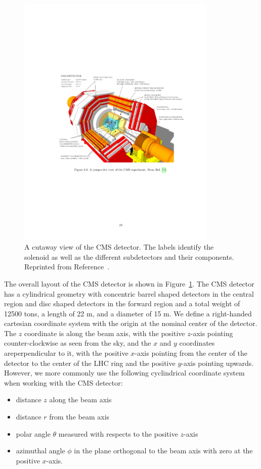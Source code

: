 \begin{figure}[htbp]
  \centering
  \includegraphics[width=0.85\textwidth]{Detector/Figures/cms_detector.pdf}
  \caption{
    A cutaway view of the CMS detector.
    The labels identify the solenoid as well as the different subdetectors and their components. 
    Reprinted from Reference~\cite{CmsWeb}. 
  }
  \label{fig:cms}
\end{figure}

The overall layout of the CMS detector is shown in Figure~\ref{fig:cms}. 
The CMS detector has a cylindrical geometry with concentric barrel shaped detectors in the central region and disc shaped detectors in the forward region and a total weight of 12500 tons, a length of 22 m, and a diameter of 15 m.
We define a right-handed cartesian coordinate system with the origin at the nominal center of the detector.
The $z$ coordinate is along the beam axis, with the positive $z$-axis pointing counter-clockwise as seen from the sky, and the $x$ and $y$ coordinates areperpendicular to it, with the positive $x$-axis pointing from the center of the detector to the center of the LHC ring and the positive $y$-axis pointing upwards.
However, we more commonly use the following cyclindrical coordinate system when working with the CMS detector:
\begin{itemize}
\item distance $z$ along the beam axis
\item distance $r$ from the beam axis
\item polar angle $\theta$ measured with respects to the positive $z$-axis
\item azimuthal angle $\phi$ in the plane orthogonal to the beam axis with zero at the positive $x$-axis.
\end{itemize}

